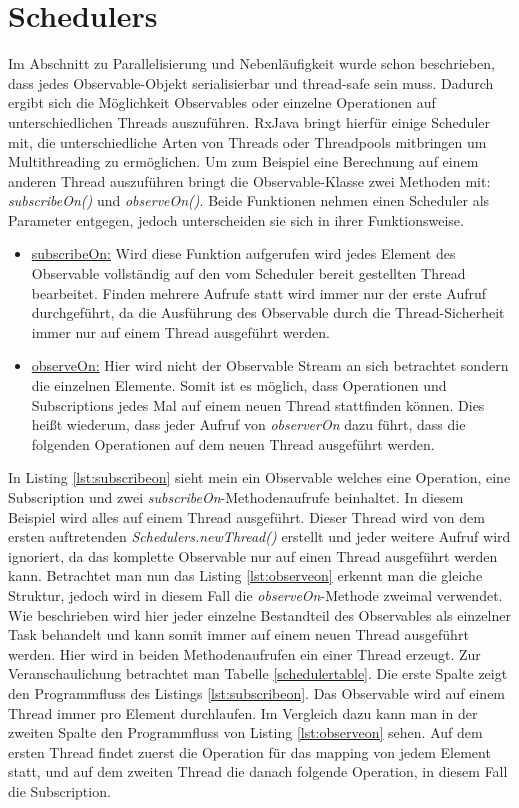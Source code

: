 \section{Schedulers}
Im Abschnitt zu Parallelisierung und Nebenläufigkeit wurde schon beschrieben, dass jedes Observable-Objekt serialisierbar und thread-safe sein muss. Dadurch ergibt sich die Möglichkeit Observables oder einzelne Operationen auf unterschiedlichen Threads auszuführen. RxJava bringt hierfür einige Scheduler mit, die unterschiedliche Arten von Threads oder Threadpools mitbringen um Multithreading zu ermöglichen. Um zum Beispiel eine Berechnung auf einem anderen Thread auszuführen bringt die Observable-Klasse zwei Methoden mit: \textit{subscribeOn()} und \textit{observeOn()}. Beide Funktionen nehmen einen Scheduler als Parameter entgegen, jedoch unterscheiden sie sich in ihrer Funktionsweise. 
\begin{itemize}
\item \underline{subscribeOn:} Wird diese Funktion aufgerufen wird jedes Element des Observable vollständig auf den vom Scheduler bereit gestellten Thread bearbeitet. Finden mehrere Aufrufe statt wird immer nur der erste Aufruf durchgeführt, da die Ausführung des Observable durch die Thread-Sicherheit immer nur auf einem Thread ausgeführt werden. 
\item \underline{observeOn:} Hier wird nicht der Observable Stream an sich betrachtet sondern die einzelnen Elemente. Somit ist es möglich, dass Operationen und Subscriptions jedes Mal auf einem neuen Thread stattfinden können. Dies heißt wiederum, dass jeder Aufruf von \textit{observerOn} dazu führt, dass die folgenden Operationen auf dem neuen Thread ausgeführt werden.
\end{itemize}

In Listing \ref{lst:subscribeon} sieht mein ein Observable welches eine Operation, eine Subscription und zwei \textit{subscribeOn}-Methodenaufrufe beinhaltet. In diesem Beispiel wird alles auf einem Thread ausgeführt. Dieser Thread wird von dem ersten auftretenden \textit{Schedulers.newThread()} erstellt und jeder weitere Aufruf wird ignoriert, da das komplette Observable nur auf einen Thread ausgeführt werden kann. Betrachtet man nun das Listing \ref{lst:observeon} erkennt man die gleiche Struktur, jedoch wird in diesem Fall die \textit{observeOn}-Methode zweimal verwendet. Wie beschrieben wird hier jeder einzelne Bestandteil des Observables als einzelner Task behandelt und kann somit immer auf einem neuen Thread ausgeführt werden. Hier wird in beiden Methodenaufrufen ein einer Thread erzeugt. Zur Veranschaulichung betrachtet man Tabelle \ref{schedulertable}. Die erste Spalte zeigt den Programmfluss des Listings \ref{lst:subscribeon}. Das Observable wird auf einem Thread immer pro Element durchlaufen. Im Vergleich dazu kann man in der zweiten Spalte den Programmfluss von Listing \ref{lst:observeon} sehen. Auf dem ersten Thread findet zuerst die Operation für das mapping von jedem Element statt, und auf dem zweiten Thread die danach folgende Operation, in diesem Fall die Subscription.
